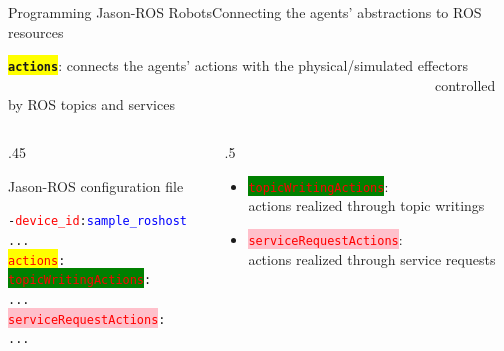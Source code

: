 \documentclass[compress]{beamer}
\newcommand{\yamlkey}[1]{\textcolor{red}{\texttt{#1}}}
\newcommand{\yamlvalue}[1]{\textcolor{blue}{\texttt{#1}}}
\begin{document}
\begin{frame}[fragile]{Programming Jason-ROS Robots}{Connecting the agents' abstractions to ROS resources}


\footnotesize
\colorbox{yellow}{\texttt{{\bf actions}}}: connects the agents' actions with the physical/simulated effectors\\

\vspace{-.5cm}
\ \ \ \ \ \ \ \ \ \ \ \ \ \ \ \ \ \ \ \ \ \ \ \ \ \ \ \ \ \ \ \ \ \ \ \ \ \ \ \ \ \ \ \ \ \ \ \ \ \ \ \ \ \ \ \ \ \ \ \ \ {\tiny controlled by ROS topics and services}
    

\begin{columns}
 \begin{column}{.45\textwidth}
 
\begin{block}{{\scriptsize Jason-ROS configuration file}}


\scriptsize
\begin{alltt}\scriptsize
- \yamlkey{device_id}: \yamlvalue{sample_roshost}
     ...
  \colorbox{yellow}{\yamlkey{actions}}:   
     \colorbox{green}{\yamlkey{topicWritingActions}}:  
        ...
     \colorbox{pink}{\yamlkey{serviceRequestActions}}:
        ...
 
\end{alltt}
    
\end{block}  

 \end{column}
 
  \hspace{-20pt}
 
 \begin{column}{.5\textwidth}
 \scriptsize
 \begin{itemize}
  \item \colorbox{green}{\yamlkey{topicWritingActions}}:\\ actions realized through topic writings  
  
  \vspace{.3cm}
  
  \item \colorbox{pink}{\yamlkey{serviceRequestActions}}:\\ actions realized through service requests
 \end{itemize}

  \end{column}
 
 
\end{columns}

\scriptsize

\end{frame}
\end{document}
